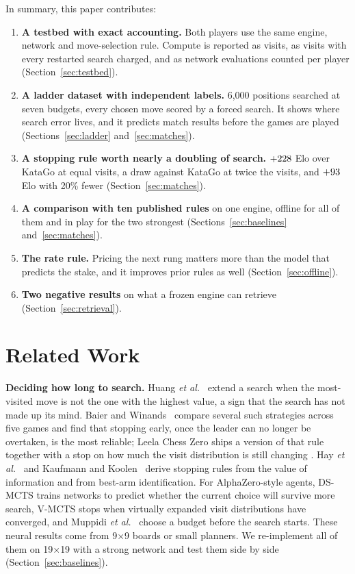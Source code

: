 \documentclass{article}
\begin{document}
In summary, this paper contributes:
\begin{enumerate}
\item \textbf{A testbed with exact accounting.} Both players use the same engine, network and move-selection rule. Compute is reported as visits, as visits with every restarted search charged, and as network evaluations counted per player (Section~\ref{sec:testbed}).
\item \textbf{A ladder dataset with independent labels.} 6{,}000 positions searched at seven budgets, every chosen move scored by a forced search. It shows where search error lives, and it predicts match results before the games are played (Sections~\ref{sec:ladder} and~\ref{sec:matches}).
\item \textbf{A stopping rule worth nearly a doubling of search.} $+228$ Elo over KataGo at equal visits, a draw against KataGo at twice the visits, and $+93$ Elo with 20\% fewer (Section~\ref{sec:matches}).
\item \textbf{A comparison with ten published rules} on one engine, offline for all of them and in play for the two strongest (Sections~\ref{sec:baselines} and~\ref{sec:matches}).
\item \textbf{The rate rule.} Pricing the next rung matters more than the model that predicts the stake, and it improves prior rules as well (Section~\ref{sec:offline}).
\item \textbf{Two negative results} on what a frozen engine can retrieve (Section~\ref{sec:retrieval}).
\end{enumerate}

\section{Related Work}

\textbf{Deciding how long to search.} Huang \textit{et al.}~ extend a search when the most-visited move is not the one with the highest value, a sign that the search has not made up its mind. Baier and Winands~ compare several such strategies across five games and find that stopping early, once the leader can no longer be overtaken, is the most reliable; Leela Chess Zero ships a version of that rule together with a stop on how much the visit distribution is still changing \cite{lc0_options}. Hay \textit{et al.}~ and Kaufmann and Koolen~ derive stopping rules from the value of information and from best-arm identification. For AlphaZero-style agents, DS-MCTS \cite{lan2021learning} trains networks to predict whether the current choice will survive more search, V-MCTS \cite{ye2022spending} stops when virtually expanded visit distributions have converged, and Muppidi \textit{et al.}~ choose a budget before the search starts. These neural results come from 9$\times$9 boards or small planners. We re-implement all of them on 19$\times$19 with a strong network and test them side by side (Section~\ref{sec:baselines}).
\end{document}
